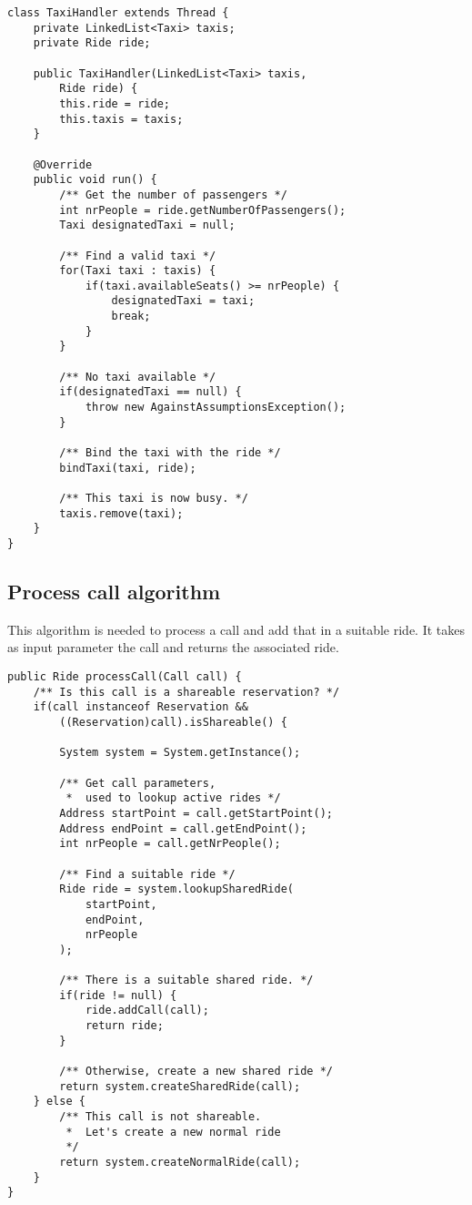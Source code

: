 \begin{lstlisting}[caption={TaxiHandler}]
class TaxiHandler extends Thread {
    private LinkedList<Taxi> taxis;
    private Ride ride;

    public TaxiHandler(LinkedList<Taxi> taxis, 
        Ride ride) {
        this.ride = ride;
        this.taxis = taxis;
    }

    @Override
    public void run() {
        /** Get the number of passengers */
        int nrPeople = ride.getNumberOfPassengers();
        Taxi designatedTaxi = null;

        /** Find a valid taxi */
        for(Taxi taxi : taxis) {
            if(taxi.availableSeats() >= nrPeople) {
                designatedTaxi = taxi;
                break;
            }
        }

        /** No taxi available */
        if(designatedTaxi == null) {
            throw new AgainstAssumptionsException();
        }

        /** Bind the taxi with the ride */
        bindTaxi(taxi, ride);
        
        /** This taxi is now busy. */
        taxis.remove(taxi);
    }
}
\end{lstlisting}
\pagebreak


\subsection{Process call algorithm}
This algorithm is needed to process a call and add that in a suitable ride.
It takes as input parameter the call and returns the associated ride.

\begin{lstlisting}[caption={processCall()}]
public Ride processCall(Call call) {
    /** Is this call is a shareable reservation? */
    if(call instanceof Reservation && 
        ((Reservation)call).isShareable() {

        System system = System.getInstance();

        /** Get call parameters, 
         *  used to lookup active rides */
        Address startPoint = call.getStartPoint();
        Address endPoint = call.getEndPoint();
        int nrPeople = call.getNrPeople();

        /** Find a suitable ride */
        Ride ride = system.lookupSharedRide(
            startPoint, 
            endPoint, 
            nrPeople
        );

        /** There is a suitable shared ride. */
        if(ride != null) {
            ride.addCall(call);
            return ride;
        }
        
        /** Otherwise, create a new shared ride */
        return system.createSharedRide(call);
    } else {
        /** This call is not shareable. 
         *  Let's create a new normal ride
         */
        return system.createNormalRide(call); 
    }
}
\end{lstlisting}
\pagebreak
